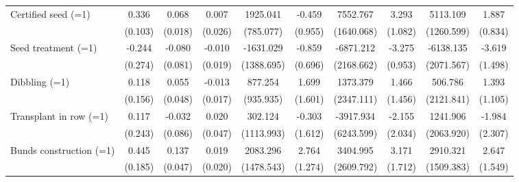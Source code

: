 {\begin{tabular}{l*{9}{c}}
Certified seed (=1) &       0.336\sym{**} &       0.068\sym{***}&       0.007         &    1925.041\sym{**} &      -0.459         &    7552.767\sym{***}&       3.293\sym{**} &    5113.109\sym{***}&       1.887\sym{*}  \\
                    &     (0.103)         &     (0.018)         &     (0.026)         &   (785.077)         &     (0.955)         &  (1640.068)         &     (1.082)         &  (1260.599)         &     (0.834)         \\
Seed treatment (=1) &      -0.244         &      -0.080         &      -0.010         &   -1631.029         &      -0.859         &   -6871.212\sym{**} &      -3.275\sym{**} &   -6138.135\sym{**} &      -3.619\sym{**} \\
                    &     (0.274)         &     (0.081)         &     (0.019)         &  (1388.695)         &     (0.696)         &  (2168.662)         &     (0.953)         &  (2071.567)         &     (1.498)         \\
Dibbling (=1)       &       0.118         &       0.055         &      -0.013         &     877.254         &       1.699         &    1373.379         &       1.466         &     506.786         &       1.393         \\
                    &     (0.156)         &     (0.048)         &     (0.017)         &   (935.935)         &     (1.601)         &  (2347.111)         &     (1.456)         &  (2121.841)         &     (1.105)         \\
Transplant in row (=1)&       0.117         &      -0.032         &       0.020         &     302.124         &      -0.303         &   -3917.934         &      -2.155         &    1241.906         &      -1.984         \\
                    &     (0.243)         &     (0.086)         &     (0.047)         &  (1113.993)         &     (1.612)         &  (6243.599)         &     (2.034)         &  (2063.920)         &     (2.307)         \\
Bunds construction (=1)&       0.445\sym{**} &       0.137\sym{**} &       0.019         &    2083.296         &       2.764\sym{*}  &    3404.995         &       3.171         &    2910.321\sym{*}  &       2.647         \\
                    &     (0.185)         &     (0.047)         &     (0.020)         &  (1478.543)         &     (1.274)         &  (2609.792)         &     (1.712)         &  (1509.383)         &     (1.549)         \\

\end{tabular}}
